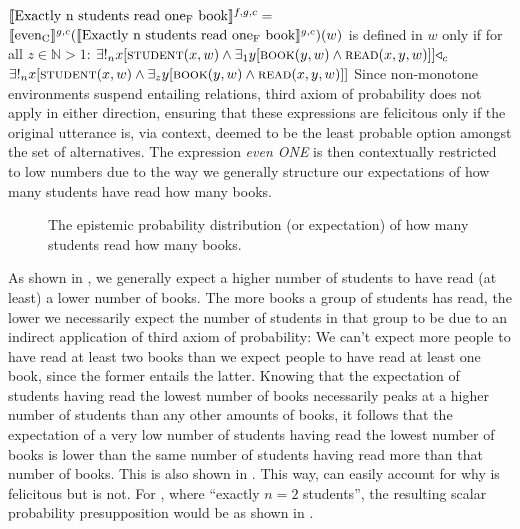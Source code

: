 \a $\intension[f,g,c]{Exactly n students read one\textsubscript{F} book}=$\\\emptyfill{}
\xe
\ex
$\intension[g,c]{even\textsubscript{C}}(\intension[g,c]{Exactly n students read one\textsubscript{F} book})(w)$ is defined in $w$ only if for all $z\in\mathbb{N}>1$: $\exists!_n{x}[\predicate{student}(x,w)\land\exists_1{y}[\predicate{book}(y,w)\land\predicate{read}(x,y,w)]]\lprob_c$\\\emptyfill$\exists!_n{x}[\predicate{student}(x,w)\land\exists_z{y}[\predicate{book}(y,w)\land\predicate{read}(x,y,w)]]$
\xe
Since non-monotone environments suspend entailing relations,  third axiom of probability does not apply in either direction, ensuring that these expressions are felicitous only if the original utterance is, via context, deemed to be the least probable option amongst the set of alternatives. The expression \textit{even \MakeUppercase{one}} is then contextually restricted to low numbers due to the way we generally structure our expectations of how many students have read how many books.
\begin{figure}[!htb]
    
    \caption{The epistemic probability distribution (or expectation) of how many students read how many books.}
\end{figure}
As shown in , we generally expect a higher number of students to have read (at least) a lower number of books. The more books a group of students has read, the lower we necessarily expect the number of students in that group to be due to an indirect application of  third axiom of probability: We can't expect more people to have read at least two books than we expect people to have read at least one book, since the former entails the latter. Knowing that the expectation of students having read the lowest number of books necessarily peaks at a higher number of students than any other amounts of books, it follows that the expectation of a very low number of students having read the lowest number of books is lower than the same number of students having read more than that number of books. This is also shown in . This way, \textcite{Crnic2011,Crnic2014-dogma,Crnic2014-nm} can easily account for why  is felicitous but  is not. For , where \enquote{exactly $n=2$ students}, the resulting scalar probability presupposition would be as shown in .
